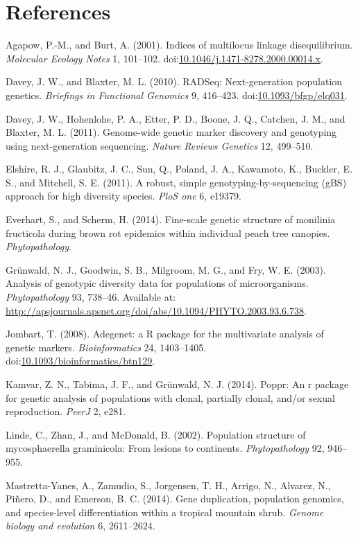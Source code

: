 \documentclass{frontiersSCNS} %
\begin{document}
\section*{References}\label{references}

Agapow, P.-M., and Burt, A. (2001). Indices of multilocus linkage
disequilibrium. \emph{Molecular Ecology Notes} 1, 101--102.
doi:\href{http://dx.doi.org/10.1046/j.1471-8278.2000.00014.x}{10.1046/j.1471-8278.2000.00014.x}.

Davey, J. W., and Blaxter, M. L. (2010). RADSeq: Next-generation
population genetics. \emph{Briefings in Functional Genomics} 9,
416--423.
doi:\href{http://dx.doi.org/10.1093/bfgp/elq031}{10.1093/bfgp/elq031}.

Davey, J. W., Hohenlohe, P. A., Etter, P. D., Boone, J. Q., Catchen, J.
M., and Blaxter, M. L. (2011). Genome-wide genetic marker discovery and
genotyping using next-generation sequencing. \emph{Nature Reviews
Genetics} 12, 499--510.

Elshire, R. J., Glaubitz, J. C., Sun, Q., Poland, J. A., Kawamoto, K.,
Buckler, E. S., and Mitchell, S. E. (2011). A robust, simple
genotyping-by-sequencing (gBS) approach for high diversity species.
\emph{PloS one} 6, e19379.

Everhart, S., and Scherm, H. (2014). Fine-scale genetic structure of
monilinia fructicola during brown rot epidemics within individual peach
tree canopies. \emph{Phytopathology}.

Grünwald, N. J., Goodwin, S. B., Milgroom, M. G., and Fry, W. E. (2003).
Analysis of genotypic diversity data for populations of microorganisms.
\emph{Phytopathology} 93, 738--46. Available at:
\url{http://apsjournals.apsnet.org/doi/abs/10.1094/PHYTO.2003.93.6.738}.

Jombart, T. (2008). Adegenet: a R package for the multivariate analysis
of genetic markers. \emph{Bioinformatics} 24, 1403--1405.
doi:\href{http://dx.doi.org/10.1093/bioinformatics/btn129}{10.1093/bioinformatics/btn129}.

Kamvar, Z. N., Tabima, J. F., and Gr{ü}nwald, N. J. (2014). Poppr: An r
package for genetic analysis of populations with clonal, partially
clonal, and/or sexual reproduction. \emph{PeerJ} 2, e281.

Linde, C., Zhan, J., and McDonald, B. (2002). Population structure of
mycosphaerella graminicola: From lesions to continents.
\emph{Phytopathology} 92, 946--955.

Mastretta-Yanes, A., Zamudio, S., Jorgensen, T. H., Arrigo, N., Alvarez,
N., Pi{ñ}ero, D., and Emerson, B. C. (2014). Gene duplication,
population genomics, and species-level differentiation within a tropical
mountain shrub. \emph{Genome biology and evolution} 6, 2611--2624.
\end{document}
